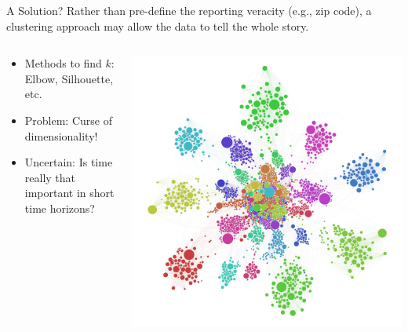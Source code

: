 \begin{frame}{A Solution?}
Rather than pre-define the reporting veracity (e.g., zip code), a clustering approach may allow the data to tell the whole story. 
\vspace{5pt}

  \begin{columns}
      \begin{column}{0.6\linewidth}
      \begin{itemize}
          \item Methods to find $k$: Elbow, Silhouette, etc.
          \vspace{-7pt}
          \item Problem: Curse of dimensionality!
          \vspace{-7pt}
          \item Uncertain: Is time really that important in short time horizons? 
      \end{itemize}
    \end{column}
    \begin{column}{0.45\linewidth}
        \includegraphics[scale = 0.12]{figures/high-dim_clustering.jpg}\\
    \end{column}
  \end{columns}
\end{frame}